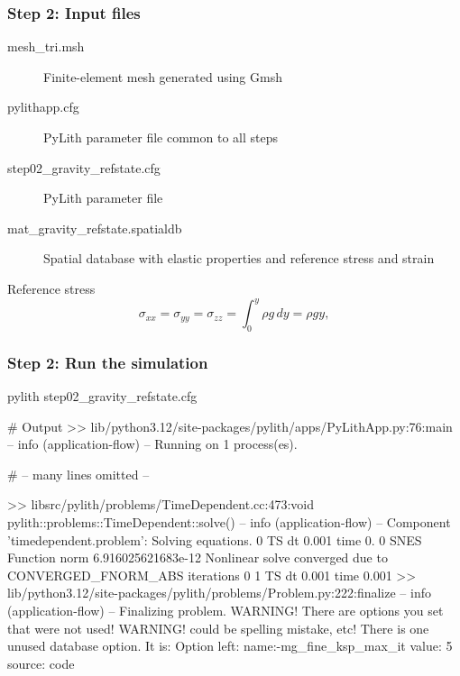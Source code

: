 \documentclass[aspectratio=169]{beamer}
\begin{document}
\begin{frame}[t,fragile]
  
\end{frame}


\begin{frame}
  \frametitle{Step 2: Input files}
  \summary{}

  \begin{description}
  \item[mesh\_tri.msh] Finite-element mesh generated using Gmsh
  \item[pylithapp.cfg] PyLith parameter file common to all steps
  \item[step02\_gravity\_refstate.cfg] PyLith parameter file
  \item[mat\_gravity\_refstate.spatialdb] Spatial database with elastic properties and reference stress and strain
  \end{description}

  \vfill
  Reference stress
  \begin{equation}
    \sigma_{xx} = \sigma_{yy} = \sigma_{zz} = \int_0^y \rho g \, dy = \rho g y,
  \end{equation}
  
\end{frame}


\begin{frame}[fragile]
  \frametitle{Step 2: Run the simulation}
  \summary{}

\begin{pyrejournal}
pylith step02_gravity_refstate.cfg

# Output
 >> lib/python3.12/site-packages/pylith/apps/PyLithApp.py:76:main
 -- info (application-flow)
 -- Running on 1 process(es).

# -- many lines omitted --

 >> libsrc/pylith/problems/TimeDependent.cc:473:void pylith::problems::TimeDependent::solve()
 -- info (application-flow)
 -- Component 'timedependent.problem': Solving equations.
0 TS dt 0.001 time 0.
    0 SNES Function norm 6.916025621683e-12
    Nonlinear solve converged due to CONVERGED_FNORM_ABS iterations 0
1 TS dt 0.001 time 0.001
 >> lib/python3.12/site-packages/pylith/problems/Problem.py:222:finalize
 -- info (application-flow)
 -- Finalizing problem.
WARNING! There are options you set that were not used!
WARNING! could be spelling mistake, etc!
There is one unused database option. It is:
Option left: name:-mg_fine_ksp_max_it value: 5 source: code
\end{pyrejournal}
  
\end{frame}
\end{document}
